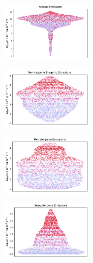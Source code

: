 \begin{figure}[H]
    \centering
    \begin{subfigure}
        \centering
        \includegraphics[width=0.49\textwidth,valign=t]{sosaa-data/figures/trajectories/trajectory-19.05.2018:04.00-aerosols.pdf}
    \end{subfigure}
    \begin{subfigure}
        \centering
        \includegraphics[width=0.49\textwidth,valign=t]{sosaa-data/figures/trajectories/trajectory-19.05.2018:04.00-biogenic.pdf}
    \end{subfigure}
    
    \begin{subfigure}
        \centering
        \includegraphics[width=0.49\textwidth,valign=t]{sosaa-data/figures/trajectories/trajectory-19.05.2018:04.00-monoterpenes.pdf}
    \end{subfigure}
    \begin{subfigure}
        \centering
        \includegraphics[width=0.49\textwidth,valign=t]{sosaa-data/figures/trajectories/trajectory-19.05.2018:04.00-sesquiterpenes.pdf}
    \end{subfigure}


\end{figure}
